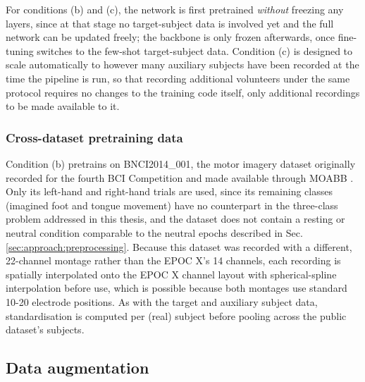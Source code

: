 For conditions (b) and (c), the network is first pretrained \emph{without} freezing any layers, since at that stage no target-subject data is involved yet and the full network can be updated freely; the backbone is only frozen afterwards, once fine-tuning switches to the few-shot target-subject data. Condition (c) is designed to scale automatically to however many auxiliary subjects have been recorded at the time the pipeline is run, so that recording additional volunteers under the same protocol requires no changes to the training code itself, only additional recordings to be made available to it.


\subsubsection{Cross-dataset pretraining data}
\label{sec:approach:bnci}

Condition (b) pretrains on BNCI2014\_001, the motor imagery dataset originally recorded for the fourth BCI Competition \cite{tangermann-2012} and made available through MOABB \cite{jayaram-2018}. Only its left-hand and right-hand trials are used, since its remaining classes (imagined foot and tongue movement) have no counterpart in the three-class problem addressed in this thesis, and the dataset does not contain a resting or neutral condition comparable to the neutral epochs described in Sec. \ref{sec:approach:preprocessing}. Because this dataset was recorded with a different, 22-channel montage rather than the EPOC X's 14 channels, each recording is spatially interpolated onto the EPOC X channel layout with spherical-spline interpolation before use, which is possible because both montages use standard 10-20 electrode positions. As with the target and auxiliary subject data, standardisation is computed per (real) subject before pooling across the public dataset's subjects.

\subsection{Data augmentation}
\label{sec:approach:augmentation}

